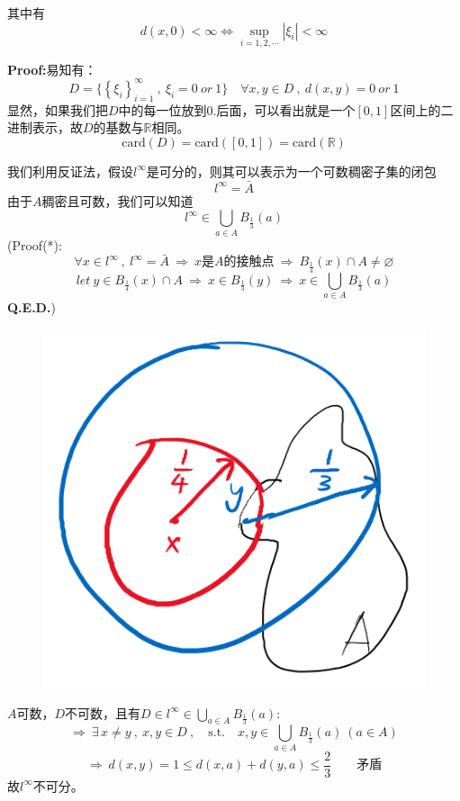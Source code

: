 其中有
\[d(x,0)<\infty \Leftrightarrow \mathop {\text{sup}}\limits_{i=1,2,\cdots}|\xi_i|<\infty\]

\textbf{Proof:}易知有：
\[D=\{\left\{\xi_i\right\}_{i=1}^{\infty} \ , \ \xi_i=0 \ or \ 1\} \quad \forall x,y \in D \ , \ d(x,y)=0 \ or \ 1\]
显然，如果我们把$D$中的每一位放到$0.$后面，可以看出就是一个$[0,1]$区间上的二进制表示，故$D$的基数与$\mathbb{R}$相同。
\[\text{card}(D)=\text{card}([0,1])=\text{card}(\mathbb{R})\]

我们利用反证法，假设$l^{\infty}$是可分的，则其可以表示为一个可数稠密子集的闭包
\[l^{\infty}=\bar{A}\]
由于$A$稠密且可数，我们可以知道
\[l^{\infty} \in \bigcup_{a \in A}B_{\frac{1}{3}}(a) \tag{*}\]
(Proof(*): 
\[\forall x \in l^{\infty} \ , \ l^{\infty}=\bar{A} \ \Rightarrow \ x\text{是}A\text{的接触点} \ \Rightarrow \ B_{\frac{1}{4}}(x)\cap A \neq \varnothing\]
\[let \ y \in B_{\frac{1}{4}}(x)\cap A \ \Rightarrow \ x \in B_{\frac{1}{3}}(y) \ \Rightarrow \ x \in \bigcup_{a \in A}B_{\frac{1}{3}}(a)\]
\textbf{Q.E.D.})
\begin{figure}[htbp]
    \center
    \includegraphics[scale=0.5]{./fig/2.1.3_1.png}
\end{figure}

$A$可数，$D$不可数，且有$D \in l^{\infty} \in \bigcup_{a \in A}B_{\frac{1}{3}}(a)$:
\[\Rightarrow \ \exists \, x \neq y \ , \ x,y \in D \ , \quad \text{s.t.} \quad x,y \in \bigcup_{a \in A}B_{\frac{1}{3}}(a) \ (a \in A)\]
\[\Rightarrow \ d(x,y)=1 \leq d(x,a)+d(y,a) \leq \frac{2}{3} \qquad \text{矛盾}\]
故$l^{\infty}$不可分。

